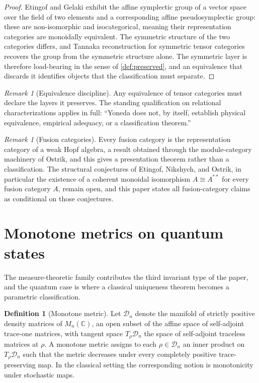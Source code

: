 \documentclass[11pt,letterpaper]{article}
\theoremstyle{definition}
\newtheorem{definition}[theorem]{Definition}
\theoremstyle{remark}
\newtheorem{remark}[theorem]{Remark}
\begin{document}
\begin{proof}
Etingof and Gelaki exhibit the affine symplectic group of a vector space over the field of two elements and a corresponding affine pseudosymplectic group: these are non-isomorphic and isocategorical, meaning their representation categories are monoidally equivalent. The symmetric structure of the two categories differs, and Tannaka reconstruction for symmetric tensor categories recovers the group from the symmetric structure alone. The symmetric layer is therefore load-bearing in the sense of \cref{def:preserved}, and an equivalence that discards it identifies objects that the classification must separate.
\end{proof}

\begin{remark}[Equivalence discipline]
\label{rem:egdiscipline}
Any equivalence of tensor categories must declare the layers it preserves. The standing qualification on relational characterizations applies in full: ``Yoneda does not, by itself, establish physical equivalence, empirical adequacy, or a classification theorem.''
\end{remark}

\begin{remark}[Fusion categories]
\label{rem:fusion}
Every fusion category is the representation category of a weak Hopf algebra, a result obtained through the module-category machinery of Ostrik, and this gives a presentation theorem rather than a classification. The structural conjectures of Etingof, Nikshych, and Ostrik, in particular the existence of a coherent monoidal isomorphism $A \cong A^{**}$ for every fusion category $A$, remain open, and this paper states all fusion-category claims as conditional on those conjectures.
\end{remark}

\section{Monotone metrics on quantum states}
\label{sec:metrics}

The measure-theoretic family contributes the third invariant type of the paper, and the quantum case is where a classical uniqueness theorem becomes a parametric classification.

\begin{definition}[Monotone metric]
\label{def:monotone}
Let $\mathcal{D}_n$ denote the manifold of strictly positive density matrices of $M_n(\mathbb{C})$, an open subset of the affine space of self-adjoint trace-one matrices, with tangent space $T_\rho \mathcal{D}_n$ the space of self-adjoint traceless matrices at $\rho$. A monotone metric assigns to each $\rho \in \mathcal{D}_n$ an inner product on $T_\rho \mathcal{D}_n$ such that the metric decreases under every completely positive trace-preserving map. In the classical setting the corresponding notion is monotonicity under stochastic maps.
\end{definition}
\end{document}
